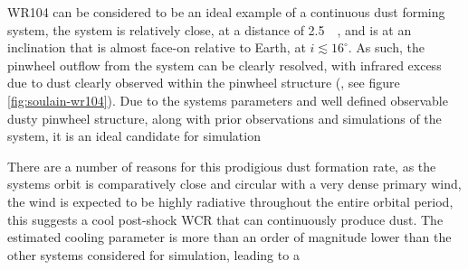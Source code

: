 
WR104 can be considered to be an ideal example of a continuous dust forming system, the system is relatively close, at a distance of \SI{2.5}{\kilo\parsec}, and is at an inclination that is almost face-on relative to Earth, at $i \lesssim 16^\circ$. 
As such, the pinwheel outflow from the system can be clearly resolved, with infrared excess due to dust clearly observed within the pinwheel structure (\textcite{soulainSPHEREViewWolfRayet2018}, see figure \ref{fig:soulain-wr104}).
Due to the systems parameters and well defined observable dusty pinwheel structure, along with prior observations and simulations of the system, it is an ideal candidate for simulation 

There are a number of reasons for this prodigious dust formation rate, as the systems orbit is comparatively close and circular with a very dense primary wind, the wind is expected to be highly radiative throughout the entire orbital period, this suggests a cool post-shock WCR that can continuously produce dust.
The estimated cooling parameter is more than an order of magnitude lower than the other systems considered for simulation, leading to a

